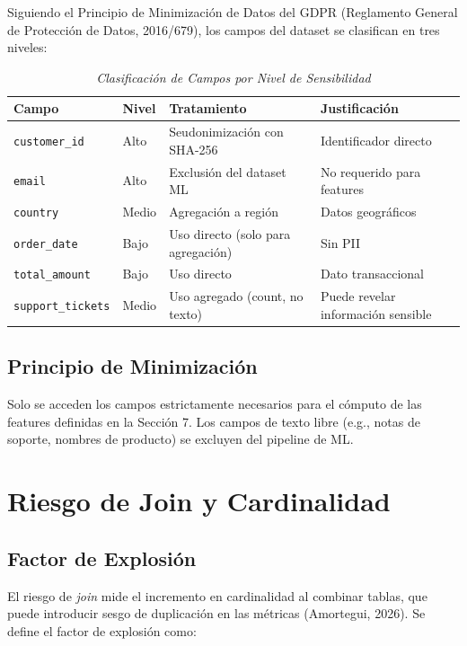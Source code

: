 \documentclass[12pt,a4paper]{article}
\begin{document}
Siguiendo el Principio de Minimización de Datos del GDPR (Reglamento General de Protección de Datos, 2016/679), los campos del dataset se clasifican en tres niveles:

\begin{table}[htbp]
\centering
\caption{\textit{Clasificación de Campos por Nivel de Sensibilidad}}
\label{tab:sensibilidad}
\begin{tabular}{@{}p{4cm}p{2.5cm}p{4cm}p{3cm}@{}}
\toprule
\textbf{Campo} & \textbf{Nivel} & \textbf{Tratamiento} & \textbf{Justificación} \\
\midrule
\texttt{customer\_id} & Alto & Seudonimización con SHA-256 & Identificador directo \\
\texttt{email} & Alto & Exclusión del dataset ML & No requerido para features \\
\texttt{country} & Medio & Agregación a región & Datos geográficos \\
\texttt{order\_date} & Bajo & Uso directo (solo para agregación) & Sin PII \\
\texttt{total\_amount} & Bajo & Uso directo & Dato transaccional \\
\texttt{support\_tickets} & Medio & Uso agregado (count, no texto) & Puede revelar información sensible \\
\bottomrule
\end{tabular}
\end{table}

\subsection{Principio de Minimización}

Solo se acceden los campos estrictamente necesarios para el cómputo de las features definidas en la Sección 7. Los campos de texto libre (e.g., notas de soporte, nombres de producto) se excluyen del pipeline de ML.

\newpage

\section{Riesgo de Join y Cardinalidad}

\subsection{Factor de Explosión}

El riesgo de \textit{join} mide el incremento en cardinalidad al combinar tablas, que puede introducir sesgo de duplicación en las métricas (Amortegui, 2026). Se define el factor de explosión como:
\end{document}
